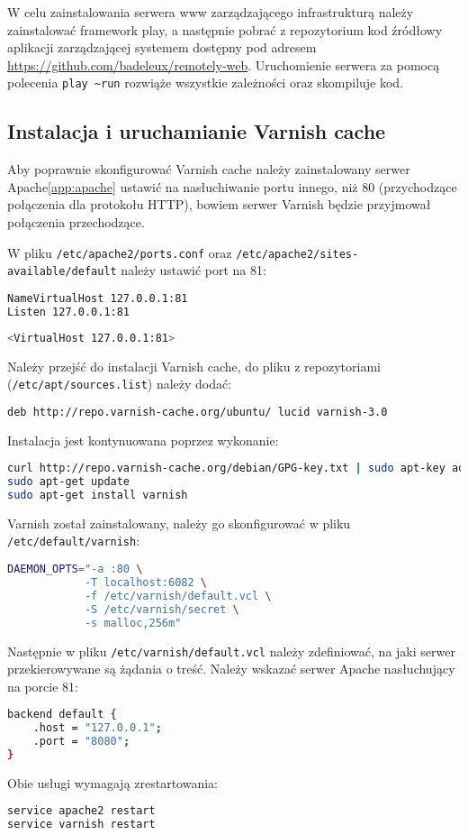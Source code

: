 W celu zainstalowania serwera www zarządzającego infrastrukturą należy zainstalować framework play, a następnie pobrać z repozytorium kod źródłowy aplikacji zarządzającej systemem dostępny pod adresem  \url{https://github.com/badeleux/remotely-web}. Uruchomienie serwera za pomocą polecenia \lstinline|play ~run| rozwiąże wszystkie zależności oraz skompiluje kod. 

\subsection{Instalacja i uruchamianie Varnish cache}

Aby poprawnie skonfigurować Varnish cache należy zainstalowany serwer Apache\ref{app:apache} ustawić na nasłuchiwanie portu innego, niż 80 (przychodzące połączenia dla protokołu HTTP), bowiem serwer Varnish będzie przyjmował połączenia przechodzące.

W pliku \lstinline{/etc/apache2/ports.conf} oraz \lstinline{/etc/apache2/sites-available/default} należy ustawić port na 81:
\begin{lstlisting}[language=bash]
NameVirtualHost 127.0.0.1:81
Listen 127.0.0.1:81
\end{lstlisting}

\begin{lstlisting}[language=bash]
<VirtualHost 127.0.0.1:81>
\end{lstlisting}

Należy przejść do instalacji Varnish cache, do pliku z repozytoriami (\lstinline{/etc/apt/sources.list}) należy dodać:
\begin{lstlisting}[language=bash]
deb http://repo.varnish-cache.org/ubuntu/ lucid varnish-3.0
\end{lstlisting}

Instalacja jest kontynuowana poprzez wykonanie:
\begin{lstlisting}[language=bash]
curl http://repo.varnish-cache.org/debian/GPG-key.txt | sudo apt-key add -
sudo apt-get update
sudo apt-get install varnish
\end{lstlisting}

Varnish został zainstalowany, należy go skonfigurować w pliku \lstinline{/etc/default/varnish}:

\begin{lstlisting}[language=bash]
DAEMON_OPTS="-a :80 \
            -T localhost:6082 \
            -f /etc/varnish/default.vcl \
            -S /etc/varnish/secret \
            -s malloc,256m"
\end{lstlisting}

Następnie w pliku \lstinline{/etc/varnish/default.vcl} należy zdefiniować, na jaki serwer przekierowywane są żądania o treść. Należy wskazać serwer Apache nasłuchujący na porcie 81:

\begin{lstlisting}[language=bash]
backend default {
    .host = "127.0.0.1";
    .port = "8080";
}
\end{lstlisting}

Obie usługi wymagają zrestartowania:

\begin{lstlisting}[language=bash]
service apache2 restart
service varnish restart
\end{lstlisting}

